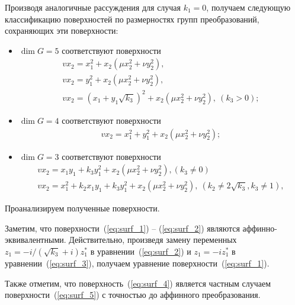 \documentclass[../main.tex]{subfiles}
\begin{document}
Производя аналогичные рассуждения для случая $k_1 = 0$, получаем следующую классификацию поверхностей по размерностях групп преобразований, сохраняющих эти поверхности: 
\begin{itemize}
\item $\dim G = 5$ соответствуют поверхности
\begin{gather}
	v x_2 = x_1^2 + x_2 (\mu x_2^2 + \nu y_2^2),\label{eq:surf_1} \\
	v x_2 = y_1^2 + x_2 (\mu x_2^2 + \nu y_2^2),\label{eq:surf_3} \\
	v x_2 = (x_1 + y_1 \sqrt{k_3})^2 + x_2 (\mu x_2^2 + \nu y_2^2),~(k_3 > 0);\label{eq:surf_2}
\end{gather}
\item $\dim G = 4$ соответствуют поверхности
\begin{gather}
	v x_2 = x_1^2 + y_1^2 + x_2 (\mu x_2^2 + \nu y_2^2);
\end{gather}
\item $\dim G = 3$ соответствуют поверхности
\begin{gather}
	v x_2 = x_1 y_1 + k_3 y_1 ^2 + x_2 (\mu x_2^2 + \nu y_2^2),(k_3 \ne 0)\label{eq:surf_4}\\
	v x_2 = x_1^2 + k_2 x_1 y_1 + k_3 y_1^2 + x_2 (\mu x_2^2 + \nu y_2^2),~(k_2 \ne 2\sqrt{k_3}, k_3 \ne 1),\label{eq:surf_5}
\end{gather}
\end{itemize}
Проанализируем полученные поверхности. 

Заметим, что поверхности~(\ref{eq:surf_1}) -- (\ref{eq:surf_2}) являются аффинно- эквивалентными. Действительно, произведя замену переменных $z_1 = -i/(\sqrt{k_3}+i)z^*_1$ в уравнении~(\ref{eq:surf_2}) и $z_1 = -i z^*_1$ в уравнении~(\ref{eq:surf_3}), получаем уравнение поверхности~(\ref{eq:surf_1}).

Также отметим, что поверхность~(\ref{eq:surf_4}) является частным случаем поверхности~(\ref{eq:surf_5}) с точностью до аффинного преобразования. 
\end{document}
